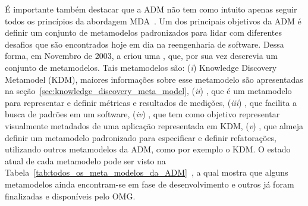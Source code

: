 É importante também destacar que a ADM não tem como intuito apenas seguir todos os princípios da abordagem MDA~\cite{ADM:OMG}. Um dos principais objetivos da ADM é definir um conjunto de metamodelos padronizados para lidar com diferentes desafios que são encontrados hoje em dia na reengenharia de software. Dessa forma, em Novembro de 2003, a  criou uma , que, por sua vez descrevia um conjunto de metamodelos. Tais metamodelos são: (\textit{i}) Knowledge Discovery Metamodel (KDM), maiores informações sobre esse metamodelo são apresentadas na seção~\ref{sec:knowledge_discovery_meta_model}, (\textit{ii}) , que é um metamodelo para representar e definir métricas e resultados de medições, (\textit{iii}) , que facilita a busca de padrões em um software, (\textit{iv}) , que tem como objetivo representar visualmente metadados de uma aplicação representada em KDM, (\textit{v}) , que almeja definir um metamodelo padronizado para especificar e definir refatorações, utilizando outros metamodelos da ADM, como por exemplo o KDM. O estado atual de cada metamodelo pode ser visto na Tabela~\ref{tab:todos_os_meta_modelos_da_ADM}~\cite{ADM:OMG}, a qual mostra que alguns metamodelos ainda encontram-se em fase de desenvolvimento e outros já foram finalizadas e disponíveis pelo OMG.

